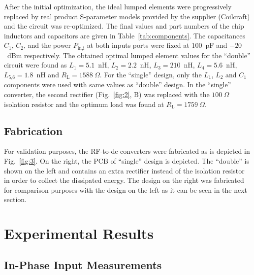 \documentclass[journal]{IEEEtran}
\begin{document}
After the initial optimization, the ideal lumped elements
were progressively replaced by  real product S-parameter  models provided by the  supplier (Coilcraft) and the circuit was re-optimized.
%
The final values and part numbers of the chip inductors and capacitors are given in Table~\ref{tab:components}.
%
The capacitances $C_\text{1}$, $C_\text{2}$, and the power $P_\text{in,i}$ at both inputs ports were fixed at $100$~pF and $-20$~dBm respectively.
%
The obtained optimal lumped element values for the ``double'' circuit were found as $L_\text{1}=5.1$~nH,  $L_\text{2}=2.2$~nH, $L_\text{3}=210$~nH, $L_\text{4}=5.6$~nH, $L_\text{5,6}=1.8$~nH and $R_\text{L}=1588~\Omega$.
%
For the ``single'' design, only the  
$L_\text{1}$, $L_\text{2}$ and $C_\text{1}$ components were used with same values as  ``double'' design.
%
In  the ``single'' converter, the second  rectifier (Fig.~\ref{fig:2}, B) was replaced with the $100~\Omega$ isolation resistor and the optimum load was found at $R_\text{L}=1759~\Omega$.


\subsection{Fabrication} 
\label{subsec:Fabrication}



For validation purposes, the RF-to-dc converters
were fabricated as is depicted in Fig.~\ref{fig:3}.
%
On the right, the PCB of  ``single'' design  is depicted. 
%
The ``double''  is shown on the left and contains an extra rectifier instead of the isolation resistor  in order to collect the dissipated energy. 
%
The design on the right was fabricated for comparison purposes with the design on the left as it can be seen in  the next section.


\section{Experimental Results}
\label{sec:expresults}

\subsection{In-Phase Input Measurements} 
\label{subsec:iphase}
\end{document}
